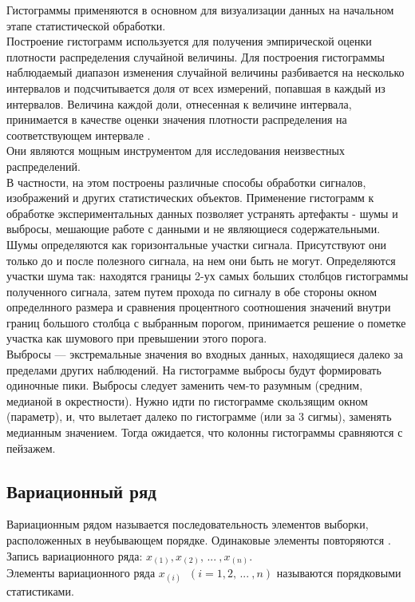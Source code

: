 \documentclass[report.tex]{subfiles}
\begin{document}
Гистограммы применяются в основном для визуализации данных на начальном этапе статистической обработки.\\
Построение гистограмм используется для получения эмпирической оценки плотности распределения случайной величины. Для построения гистограммы наблюдаемый диапазон изменения случайной величины разбивается на несколько интервалов и подсчитывается доля от всех измерений, попавшая в каждый из интервалов. Величина каждой доли, отнесенная к величине интервала, принимается в качестве оценки значения плотности распределения на соответствующем интервале \cite{s:hist}.\\
Они являются мощным инструментом для исследования неизвестных распределений.\\
В частности, на этом построены различные способы обработки сигналов, изображений и других статистических объектов. Применение гистограмм к обработке экспериментальных данных позволяет устранять артефакты - шумы и выбросы, мешающие работе с данными и не являющиеся содержательными. \\
Шумы определяются как горизонтальные участки сигнала. Присутствуют они только до и
после полезного сигнала, на нем они быть не могут. Определяются участки шума так: находятся границы 2-ух самых больших столбцов гистограммы полученного сигнала, затем путем прохода по сигналу в обе стороны окном определнного размера и сравнения процентного соотношения значений внутри границ большого столбца с выбранным порогом, принимается решение о пометке участка как шумового при превышении этого порога.\\
Выбросы —  экстремальные значения во входных данных, находящиеся далеко за пределами других наблюдений. На гистограмме выбросы будут формировать одиночные пики. Выбросы следует заменить чем-то разумным (средним, медианой в окрестности). Нужно идти по гистограмме скользящим окном (параметр), и, что вылетает далеко по гистограмме (или за 3 сигмы), заменять медианным значением. Тогда ожидается, что колонны гистограммы сравняются с пейзажем.


\subsection{Вариационный ряд}

Вариационным рядом называется последовательность элементов выборки, расположенных в неубывающем порядке. Одинаковые элементы повторяются \cite[с. 409]{b:probSectMath}.\\
Запись вариационного ряда: $x_{(1)}, x_{(2)}, \, ... \: , x_{(n)}$.\\
Элементы вариационного ряда $x_{(i)} \;\; (i = 1, 2, \, ... \: , n)$ называются порядковыми статистиками.
\end{document}
